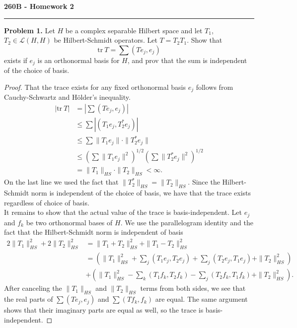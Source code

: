 \documentclass[11pt,letterpaper]{report}
\newcommand{\mcal}[1]{\mathcal{#1}}
\newcommand{\tr}{\text{tr}}
\begin{document}
\begin{center}
{\bf \Large 260B - Homework 2} %
\vspace{0.2cm}
\hrule
\end{center}

\noindent\textbf{Problem 1. }Let $H$ be a complex separable Hilbert space and let $T_1$, $T_2\in \mcal{L}(H, H)$ be Hilbert-Schmidt operators. Let $T = T_2T_1$. Show that
\[
\tr\ T = \sum(Te_j, e_j)
\]
exists if $e_j$ is an orthonormal basis for $H$, and prov that the sum is independent of the choice of basis.
\begin{proof}
	That the trace exists for any fixed orthonormal basis $e_j$ follows from Cauchy-Schwartz and H\"older's inequality.
	\begin{align*}
		|\tr\ T| &= \left|\sum (Te_j, e_j)\right|\\
		&\leq \sum |(T_1e_j, T_2^*e_j)|\\
		&\leq \sum \|T_1e_j\|\cdot \|T_2^*e_j\|\\
		&\leq \left(\sum \|T_1e_j\|^2\right)^{1/2}\left(\sum \|T_2^*e_j\|^2\right)^{1/2}\\
		&= \|T_1\|_{HS}\cdot \|T_2\|_{HS}<\infty.
	\end{align*}
	On the last line we used the fact that $\|T_2^*\|_{HS} = \|T_2\|_{HS}$. Since the Hilbert-Schmidt norm is independent of the choice of basis, we have that the trace exists regardless of choice of basis.\\

	\noindent It remains to show that the actual value of the trace is basis-independent. Let $e_j$ and $f_k$ be two orthonormal bases of $H$. We use the parallelogram identity and the fact that the Hilbert-Schmidt norm is independent of basis
	\begin{align*}
		2\|T_1\|_{HS}^2 + 2\|T_2\|_{HS}^2 &= \|T_1+T_2\|_{HS}^2 + \|T_1-T_2\|_{HS}^2\\
		&= \left(\|T_1\|_{HS}^2 + \sum_j(T_1e_j, T_2e_j) + \sum_j(T_2e_j, T_1e_j) + \|T_2\|_{HS}^2\right)\\
		&+ \left(\|T_1\|_{HS}^2 - \sum_k(T_1f_k, T_2f_k) - \sum_j(T_2f_k, T_1f_k) + \|T_2\|_{HS}^2\right).
	\end{align*}
	After canceling the $\|T_1\|_{HS}$ and $\|T_2\|_{HS}$ terms from both sides, we see that the real parts of $\sum (Te_j, e_j)$ and $\sum (Tf_k, f_k)$ are equal. The same argument shows that their imaginary parts are equal as well, so the trace is basis-independent.


\end{proof}
\end{document}
